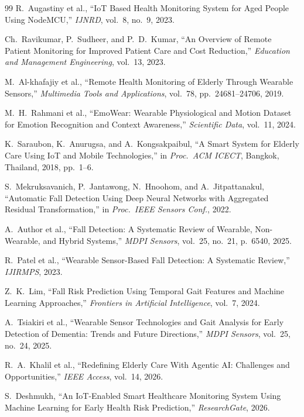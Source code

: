 \documentclass[conference]{IEEEtran}
\begin{document}
\begin{thebibliography}{99}
R.~Augastiny et al., ``IoT Based Health Monitoring System for Aged People
Using NodeMCU,'' \textit{IJNRD}, vol.~8, no.~9, 2023.

Ch.~Ravikumar, P.~Sudheer, and P.~D.~Kumar, ``An Overview of Remote
Patient Monitoring for Improved Patient Care and Cost Reduction,''
\textit{Education and Management Engineering}, vol.~13, 2023.

M.~Al-khafajiy et al., ``Remote Health Monitoring of Elderly Through
Wearable Sensors,'' \textit{Multimedia Tools and Applications}, vol.~78,
pp.~24681--24706, 2019.

M.~H.~Rahmani et al., ``EmoWear: Wearable Physiological and Motion
Dataset for Emotion Recognition and Context Awareness,'' \textit{Scientific
Data}, vol.~11, 2024.

K.~Saraubon, K.~Anurugsa, and A.~Kongsakpaibul, ``A Smart System for
Elderly Care Using IoT and Mobile Technologies,'' in \textit{Proc.\ ACM
ICECT}, Bangkok, Thailand, 2018, pp.~1--6.

S.~Mekruksavanich, P.~Jantawong, N.~Hnoohom, and A.~Jitpattanakul,
``Automatic Fall Detection Using Deep Neural Networks with Aggregated
Residual Transformation,'' in \textit{Proc.\ IEEE Sensors Conf.}, 2022.

A.~Author et al., ``Fall Detection: A Systematic Review of Wearable,
Non-Wearable, and Hybrid Systems,'' \textit{MDPI Sensors}, vol.~25, no.~21,
p.~6540, 2025.

R.~Patel et al., ``Wearable Sensor-Based Fall Detection: A Systematic
Review,'' \textit{IJIRMPS}, 2023.

Z.~K.~Lim, ``Fall Risk Prediction Using Temporal Gait Features and Machine
Learning Approaches,'' \textit{Frontiers in Artificial Intelligence},
vol.~7, 2024.

A.~Tsiakiri et al., ``Wearable Sensor Technologies and Gait Analysis for
Early Detection of Dementia: Trends and Future Directions,'' \textit{MDPI
Sensors}, vol.~25, no.~24, 2025.

R.~A.~Khalil et al., ``Redefining Elderly Care With Agentic AI: Challenges
and Opportunities,'' \textit{IEEE Access}, vol.~14, 2026.

S.~Deshmukh, ``An IoT-Enabled Smart Healthcare Monitoring System Using
Machine Learning for Early Health Risk Prediction,'' \textit{ResearchGate},
2026.


\end{thebibliography}
\end{document}
